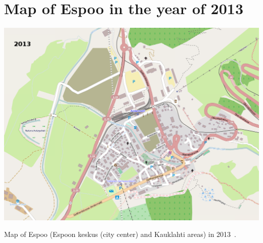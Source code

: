 \documentclass[a4paper]{article}
\newcommand{\mycity}{Espoo\xspace}
\begin{document}
\newpage

\section{Map of \mycity in the year of 2013}
\includegraphics[keepaspectratio,width=\textwidth]{map3}
\centerline{Map of Espoo (Espoon keskus (city center) and Kauklahti areas) in 2013~\cite{espoo2013}.}

\newpage

\end{document}
